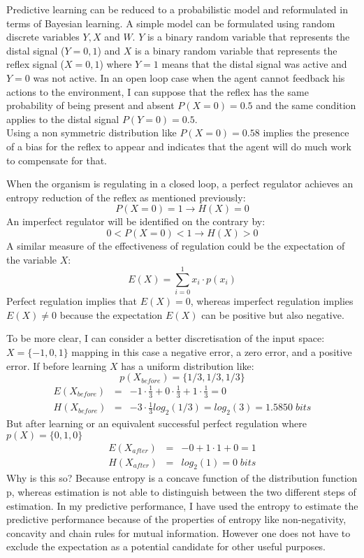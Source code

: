 Predictive learning can be reduced to a probabilistic model and reformulated
in terms of Bayesian learning.
A simple model can be formulated using random discrete variables $Y,X$ and $W$.
$Y$ is a binary random variable that represents the distal signal ($Y={0,1}$) and
$X$ is a binary random variable that represents the reflex signal ($X={0,1}$)
where $Y=1$ means that the distal signal was active and $Y=0$ was not active.
In an open loop case when the agent cannot feedback his actions to the environment,
I can suppose that the reflex has the same probability of being present and
absent $P(X=0)=0.5$ and the same condition applies to the distal signal $P(Y=0)=0.5$.\\
Using a non symmetric distribution like $P(X=0)=0.58$ implies the presence of a
bias for the reflex to appear and indicates that the agent will do much work to compensate for that.

When the organism is regulating in a closed loop, a perfect regulator achieves
an entropy reduction of the reflex as mentioned previously:
\begin{equation}
P(X=0)=1 \rightarrow H(X)=0
\end{equation}
An imperfect regulator will be identified on the contrary by:
\begin{equation}
0 < P(X=0) < 1 \rightarrow H(X) > 0
\end{equation}
A similar measure of the effectiveness  of regulation could be the expectation of the variable $X$:
\begin{equation}
E(X)=\sum_{i=0}^{1} x_{i} \cdot p(x_i)
\end{equation}
Perfect regulation implies that $E(X)=0$, whereas imperfect regulation implies $E(X)\neq 0$ because 
the expectation $E(X)$ can be positive but also negative.

To be more clear, I can consider a better discretisation of the input space: $X=\{ -1,0,1\}$ 
mapping in this case a negative error, a zero error, and a positive error. 
If before learning $X$ has a uniform distribution like:
\begin{equation}
p(X_{before})=\{1/3,1/3,1/3 \}
\end{equation}
\begin{eqnarray}
E(X_{before})&=&-1\cdot \frac{1}{3}+0 \cdot \frac{1}{3}+1 \cdot \frac{1}{3}=0 \\
H(X_{before})&=&-3\cdot \frac{1}{3}log_2(1/3)=log_2(3)=1.5850 \; bits
\end{eqnarray}
But after learning or an equivalent successful perfect regulation where $p(X)=\{0,1,0\}$
\begin{eqnarray}
E(X_{after})&=&-0+1\cdot 1+0= 1 \\
H(X_{after})&=&log_2(1)=0 \; bits
\end{eqnarray}
Why is this so? Because entropy is a concave function of the distribution function p, 
whereas estimation is not able to distinguish between the two different steps of estimation.
In my predictive performance, I have used the entropy to estimate the predictive
performance because of the properties of entropy like non-negativity, concavity and
chain rules for mutual information.
However one does not have to exclude the expectation as a potential candidate for other
useful purposes.

